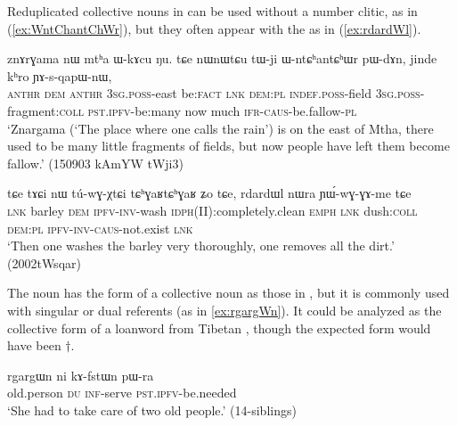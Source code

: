 Reduplicated collective nouns in  can be used without a number clitic, as in (\ref{ex:WntChantChWr}), but they often appear with the  as in (\ref{ex:rdardWl}).

\begin{exe}
\ex \label{ex:WntChantChWr}
\gll znɤrɣama nɯ mtʰa ɯ-kɤcu ŋu. tɕe nɯnɯtɕu tɯ-ji ɯ-ntɕʰantɕʰɯr pɯ-dɤn, jinde kʰro ɲɤ-s-qapɯ-nɯ,\\
\textsc{anthr} \textsc{dem} \textsc{anthr} \textsc{3sg}.\textsc{poss}-east be:\textsc{fact} \textsc{lnk} \textsc{dem}:\textsc{pl} \textsc{indef}.\textsc{poss}-field \textsc{3sg}.\textsc{poss}-fragment:\textsc{coll} \textsc{pst}.\textsc{ipfv}-be:many now much \textsc{ifr}-\textsc{caus}-be.fallow-\textsc{pl}\\
\glt `Znargama (`The place where one calls the rain') is on the east of Mtha, there used to be many little fragments of fields, but now people have left them become fallow.' (150903 kAmYW tWji3)
\end{exe}

\begin{exe}
\ex \label{ex:rdardWl}
\gll tɕe tɤɕi nɯ tú-wɣ-χtɕi tɕʰɣaʁtɕʰɣaʁ ʑo tɕe, rdardɯl nɯra ɲɯ́-wɣ-ɣɤ-me tɕe \\
\textsc{lnk} barley \textsc{dem} \textsc{ipfv}-\textsc{inv}-wash \textsc{idph}(II):completely.clean \textsc{emph} \textsc{lnk} dush:\textsc{coll} \textsc{dem}:\textsc{pl} \textsc{ipfv}-\textsc{inv}-\textsc{caus}-not.exist \textsc{lnk} \\
\glt `Then one washes the barley very thoroughly, one removes all the dirt.' (2002tWsqar)
\end{exe}
 
The noun  has the form of a collective noun as those in , but it is commonly used with singular or dual referents (as in \ref{ex:rgargWn}). It could be analyzed as the collective form of a loanword from Tibetan , though the expected form would have been $\dagger$. 
 
\begin{exe}
\ex \label{ex:rgargWn}
\gll rgargɯn ni kɤ-fstɯn pɯ-ra \\
old.person \textsc{du} \textsc{inf}-serve \textsc{pst}.\textsc{ipfv}-be.needed \\
\glt `She had to take care of two old people.' (14-siblings) 
\end{exe}

